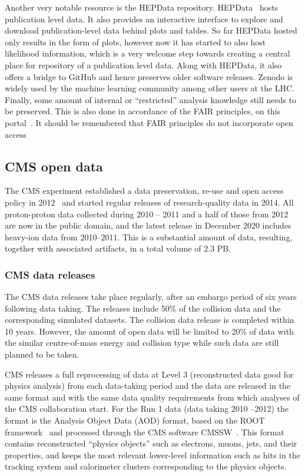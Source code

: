\documentclass[10pt]{article}
\begin{document}
Another very notable resource is the HEPData repository. HEPData~\cite{hepdata} hosts publication level data. It also provides an interactive interface to explore and download publication-level data behind plots and tables. So far HEPData hosted only results in the form of plots, however now it has started to also host likelihood information, which is a very welcome step towards creating a central place for repository of a publication level data. Along with HEPData,  it also offers a bridge to GitHub and hence preserves older software releases. Zenodo is widely used by the machine learning community among other users at the LHC. Finally, some amount of internal or “restricted” analysis knowledge still needs to be preserved. This is also done in accordance of the FAIR principles, on this portal~\cite{restricted}. It should be remembered that FAIR principles do not incorporate open access


\subsection{CMS open data}\label{sec:cms}
%
The CMS experiment established a data preservation, re-use and open access policy in 2012~\cite{cmspolicy} and started regular releases of research-quality data in 2014. All proton-proton data collected during 2010 -- 2011 and a half of those from 2012 are now in the public domain, and the latest release in December 2020 includes heavy-ion data from 2010--2011. This is a substantial amount of data, resulting, together with associated artifacts, in a total volume of 2.3 PB.


\subsubsection{CMS data releases}\label{sec:cms:releases}
%
The CMS data releases take place regularly, after an embargo period of six years following data taking. The releases include 50\% of the collision data and the corresponding simulated datasets. The collision data release is completed within 10 years. However, the amount of open  data will be limited to 20\% of data with the similar centre-of-mass energy and collision type while such data are still planned to be taken.

CMS releases a full reprocessing of data at Level 3 (reconstructed data good for physics analysis) from each data-taking period and the data are released in the same format and with the same data quality requirements from which analyses of the CMS collaboration start. For the Run 1 data (data taking 2010 --2012) the format is the Analysis Object Data (AOD) format, based on the ROOT framework~\cite{root} and processed through the CMS software CMSSW~\cite{cmssw}. This format contains reconstructed “physics objects” such as electrons, muons, jets, and their properties, and keeps the most relevant lower-level information such as hits in the tracking system and calorimeter clusters corresponding to the physics objects.
\end{document}
